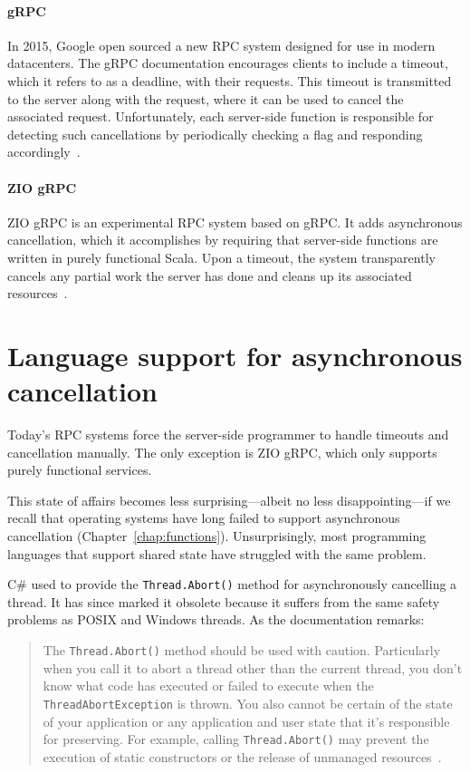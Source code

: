 \paragraph{gRPC}
In 2015, Google open sourced a new RPC system designed for use in modern datacenters.
The gRPC documentation encourages clients to include a timeout, which it refers to as
a deadline, with their requests.  This timeout is transmitted to the server along
with the request, where it can be used to cancel the associated request.
Unfortunately, each server-side function is responsible for detecting such
cancellations by periodically checking a flag and responding
accordingly~\cite{www-grpc}.

\paragraph{ZIO gRPC}
ZIO gRPC is an experimental RPC system based on gRPC.  It adds asynchronous
cancellation, which it accomplishes by requiring that server-side functions are
written in purely functional Scala.  Upon a timeout, the system transparently cancels
any partial work the server has done and cleans up its associated
resources~\cite{www-zio-grpc}.


\section{Language support for asynchronous cancellation}
\label{sec:strobelight:cancellation}

Today's RPC systems force the server-side programmer to handle timeouts and
cancellation manually.  The only exception is ZIO gRPC, which only supports purely
functional services.

This state of affairs becomes less surprising---albeit no less disappointing---if we
recall that operating systems have long failed to support asynchronous cancellation
(Chapter~\ref{chap:functions}).  Unsurprisingly, most programming languages that
support shared state have struggled with the same problem.

C\# used to provide the \texttt{Thread.Abort()} method for asynchronously cancelling
a thread.  It has since marked it obsolete because it suffers from the same safety
problems as POSIX and Windows threads.  As the documentation remarks:
\begin{quote}
The \texttt{Thread.Abort()} method should be used with caution.  Particularly when
you call it to abort a thread other than the current thread, you don't know what code
has executed or failed to execute when the \texttt{ThreadAbortException} is thrown.
You also cannot be certain of the state of your application or any application and
user state that it's responsible for preserving.  For example, calling
\texttt{Thread.Abort()} may prevent the execution of static constructors or the
release of unmanaged resources~\cite{www-csharp-abort}.
\end{quote}

